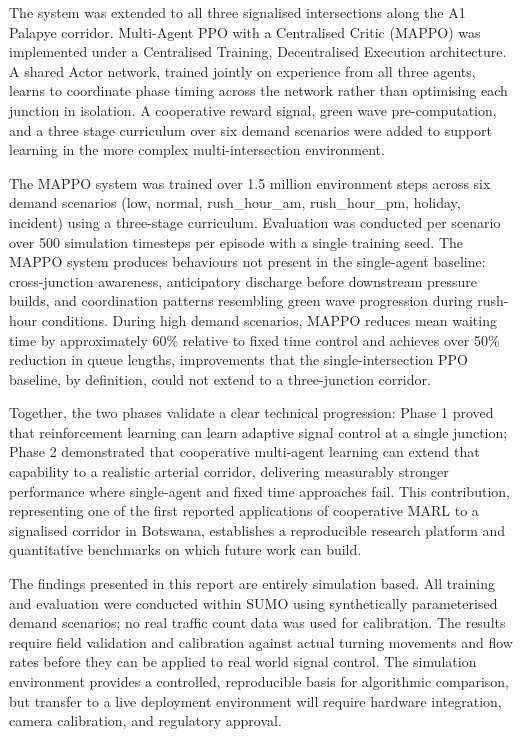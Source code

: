﻿\documentclass[11pt, a4paper]{report}
\begin{document}
The system was extended to all three signalised intersections along the A1 Palapye corridor. Multi-Agent PPO with a Centralised Critic (MAPPO) was implemented under a Centralised Training, Decentralised Execution architecture. A shared Actor network, trained jointly on experience from all three agents, learns to coordinate phase timing across the network rather than optimising each junction in isolation. A cooperative reward signal, green wave pre-computation, and a three stage curriculum over six demand scenarios were added to support learning in the more complex multi-intersection environment.

The MAPPO system was trained over 1.5 million environment steps across six demand scenarios (low, normal, rush\_hour\_am, rush\_hour\_pm, holiday, incident) using a three-stage curriculum. Evaluation was conducted per scenario over 500 simulation timesteps per episode with a single training seed. The MAPPO system produces behaviours not present in the single-agent baseline: cross-junction awareness, anticipatory discharge before downstream pressure builds, and coordination patterns resembling green wave progression during rush-hour conditions. During high demand scenarios, MAPPO reduces mean waiting time by approximately 60\% relative to fixed time control and achieves over 50\% reduction in queue lengths, improvements that the single-intersection PPO baseline, by definition, could not extend to a three-junction corridor.

Together, the two phases validate a clear technical progression: Phase 1 proved that reinforcement learning can learn adaptive signal control at a single junction; Phase 2 demonstrated that cooperative multi-agent learning can extend that capability to a realistic arterial corridor, delivering measurably stronger performance where single-agent and fixed time approaches fail. This contribution, representing one of the first reported applications of cooperative MARL to a signalised corridor in Botswana, establishes a reproducible research platform and quantitative benchmarks on which future work can build.

The findings presented in this report are entirely simulation based. All training and evaluation were conducted within SUMO using synthetically parameterised demand scenarios; no real traffic count data was used for calibration. The results require field validation and calibration against actual turning movements and flow rates before they can be applied to real world signal control. The simulation environment provides a controlled, reproducible basis for algorithmic comparison, but transfer to a live deployment environment will require hardware integration, camera calibration, and regulatory approval.
\end{document}
